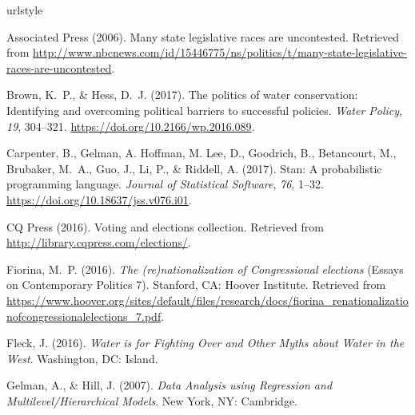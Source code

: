 \documentclass[draft]{agujournal}
\begin{document}
%
\fi
%
%
%
\begin{thebibliography}{33}
\providecommand{\natexlab}[1]{#1}
\expandafter\ifx\csname urlstyle\endcsname\relax
  \providecommand{\doi}[1]{doi:\discretionary{}{}{}#1}\else
  \providecommand{\doi}{doi:\discretionary{}{}{}\begingroup
  \urlstyle{rm}\Url}\fi


  Associated Press (2006).
  Many state legislative races are uncontested.
  Retrieved from
  \url{http://www.nbcnews.com/id/15446775/ns/politics/t/many-state-legislative-races-are-uncontested}.

  Brown, K.~P., \& Hess, D.~J. (2017).
  The politics of water conservation:
  Identifying and overcoming political barriers to successful policies.
  \textit{Water Policy}, \textit{19}, 304--321.
  \url{https://doi.org/10.2166/wp.2016.089}.

  Carpenter, B., Gelman, A. Hoffman, M. Lee, D., Goodrich, B., Betancourt, M.,
  Brubaker, M.~A., Guo, J., Li, P., \& Riddell, A. (2017).
  Stan: A probabilistic programming language.
  \textit{Journal of Statistical Software}, \textit{76}, 1--32.
  \url{https://doi.org/10.18637/jss.v076.i01}.

{CQ Press} (2016).
  Voting and elections collection.
  Retrieved from
  \url{http://library.cqpress.com/elections/}.

  Fiorina, M.~P. (2016).
  \textit{The (re)nationalization of {C}ongressional elections\/}
  (Essays on Contemporary Politics 7).
  Stanford, CA: Hoover Institute.
  Retrieved from
  \url{https://www.hoover.org/sites/default/files/research/docs/fiorina_renationalizationofcongressionalelections_7.pdf}.

  Fleck, J. (2016).
  \textit{Water is for Fighting Over and Other Myths about Water in the West}.
  Washington, DC: Island.

  Gelman, A., \& Hill, J. (2007).
  \textit{Data Analysis using Regression and Multilevel/Hierarchical Models}.
  New York, NY: Cambridge.


\end{thebibliography}
\end{document}
